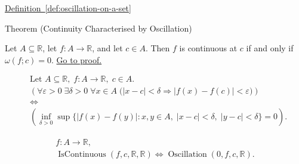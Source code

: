 \begin{dependencies}
\hyperref[def:oscillation-on-a-set]{Definition~\ref*{def:oscillation-on-a-set}}
\end{dependencies}


\begin{theorembox}{Theorem (Continuity Characterised by Oscillation)}
\begin{theorem}
\label{thm:continuity-iff-zero-oscillation}
Let $A \subseteq \mathbb{R}$, let $f \colon A \to \mathbb{R}$, and let $c \in A$. Then $f$ is continuous at $c$ if and only if $\omega(f;c)=0$.
\hyperref[prf:continuity-iff-zero-oscillation]{Go to proof.}
\end{theorem}
\end{theorembox}

\begin{remark*}
\[
\begin{aligned}
&\text{Let } A \subseteq \mathbb{R},\; f \colon A \to \mathbb{R},\; c \in A.\\
&\left(\forall \varepsilon>0 \; \exists \delta>0 \; \forall x \in A \; \bigl(|x-c|<\delta \Rightarrow |f(x)-f(c)|<\varepsilon\bigr)\right)\\
&\Longleftrightarrow\\
&\left(\inf_{\delta>0} \sup \bigl\{|f(x)-f(y)| : x,y \in A,\; |x-c|<\delta,\; |y-c|<\delta \bigr\} = 0\right).
\end{aligned}
\]
\end{remark*}

\begin{remark*}
\[
\begin{aligned}
  f\colon A\to\mathbb{R},\\
\operatorname{IsContinuous}(f,c,\mathbb{R},\mathbb{R}) \Longleftrightarrow \operatorname{Oscillation}(0,f,c,\mathbb{R}).
\end{aligned}
\]
\end{remark*}

